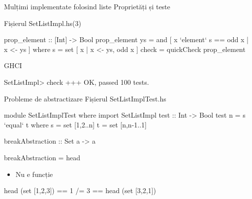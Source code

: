 \documentclass[xcolor=pdftex,romanian,colorlinks]{beamer}
\begin{document}
\begin{frame}[fragile]{Mulțimi implementate folosind liste}
{Proprietăți și teste}
\begin{block}{Fișierul SetListImpl.hs\hfill (3)}
\begin{asciihs}
prop_element :: [Int] -> Bool
prop_element ys =
    and [ x `element` s == odd x | x <- ys ]
  where
    s = set [ x | x <- ys, odd x ]
check =
    quickCheck prop_element
\end{asciihs}
\end{block}
\begin{block}{GHCI}
\begin{asciihs}
SetListImpl> check
+++ OK, passed 100 tests.
\end{asciihs}
\end{block}
\end{frame}

\begin{frame}[fragile]{Probleme de abstractizare}
{Fișierul SetListImplTest.hs}
\begin{asciihs}
module SetListImplTest where
import SetListImpl
test :: Int -> Bool
test n =
   s `equal` t
  where
    s = set [1,2..n]
    t = set [n,n-1..1]

breakAbstraction :: Set a -> a
\end{asciihs}
\vspace{-2ex}
\begin{asciihs}
breakAbstraction = head
\end{asciihs}
\begin{itemize}
\item Nu e funcție
\end{itemize}
\begin{asciihs}
head (set [1,2,3]) == 1 /= 3 == head (set [3,2,1])
\end{asciihs}
\end{frame}
\end{document}
